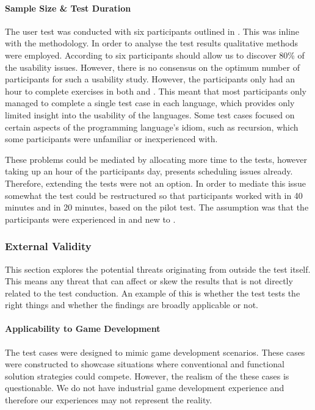 \paragraph{Sample Size \& Test Duration}
The user test was conducted with six participants outlined in . This was inline with the \champagne methodology. In order to analyse the test results qualitative methods were employed. According to \cite{virzi1992refining} six participants should allow us to discover 80\% of the usability issues. However, there is no consensus on the optimum number of participants for such a usability study\cite{hwang2010number}. However, the participants only had an hour to complete exercises in both \fs and \cs. This meant that most participants only managed to complete a single test case in each language, which provides only limited insight into the usability of the languages. Some test cases focused on certain aspects of the programming language's idiom, such as recursion, which some participants were unfamiliar or inexperienced with.

These problems could be mediated by allocating more time to the tests, however taking up an hour of the participants day, presents scheduling issues already. Therefore, extending the tests were not an option. In order to mediate this issue somewhat the test could be restructured so that participants worked with \fs in 40 minutes and \cs in 20 minutes, based on the pilot test. The assumption was that the participants were experienced in \cs and new to \fs. 

\subsubsection{External Validity}
This section explores the potential threats originating from outside the test itself. This means any threat that can affect or skew the results that is not directly related to the test conduction. An example of this is whether the test tests the right things and whether the findings are broadly applicable or not.

\paragraph{Applicability to Game Development}
The test cases were designed to mimic game development scenarios. These cases were constructed to showcase situations where conventional and functional solution strategies could compete. However, the realism of the these cases is questionable. We do not have industrial game development experience and therefore our experiences may not represent the reality.


